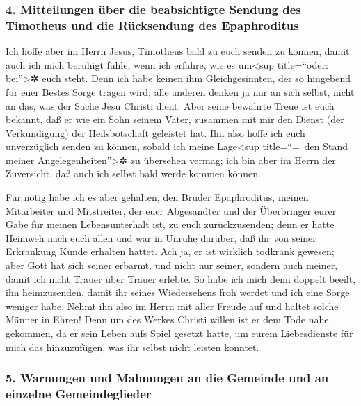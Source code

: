 \hypertarget{mitteilungen-uxfcber-die-beabsichtigte-sendung-des-timotheus-und-die-ruxfccksendung-des-epaphroditus}{%
\subsubsection{4. Mitteilungen über die beabsichtigte Sendung des
Timotheus und die Rücksendung des
Epaphroditus}\label{mitteilungen-uxfcber-die-beabsichtigte-sendung-des-timotheus-und-die-ruxfccksendung-des-epaphroditus}}

 Ich hoffe aber im Herrn Jesus, Timotheus bald zu euch
senden zu können, damit auch ich mich beruhigt fühle, wenn ich erfahre,
wie es um\textless sup title=``oder: bei''\textgreater✲ euch steht.
 Denn ich habe keinen ihm Gleichgesinnten, der so
hingebend für euer Bestes Sorge tragen wird;  alle
anderen denken ja nur an sich selbst, nicht an das, was der Sache Jesu
Christi dient.  Aber seine bewährte Treue ist euch
bekannt, daß er wie ein Sohn seinem Vater, zusammen mit mir den Dienst
(der Verkündigung) der Heilsbotschaft geleistet hat.  Ihn
also hoffe ich euch unverzüglich senden zu können, sobald ich meine
Lage\textless sup title=``=~den Stand meiner
Angelegenheiten''\textgreater✲ zu übersehen vermag;  ich
bin aber im Herrn der Zuversicht, daß auch ich selbst bald werde kommen
können.

 Für nötig habe ich es aber gehalten, den Bruder
Epaphroditus, meinen Mitarbeiter und Mitstreiter, der euer Abgesandter
und der Überbringer eurer Gabe für meinen Lebensunterhalt ist, zu euch
zurückzusenden;  denn er hatte Heimweh nach euch allen
und war in Unruhe darüber, daß ihr von seiner Erkrankung Kunde erhalten
hattet.  Ach ja, er ist wirklich todkrank gewesen; aber
Gott hat sich seiner erbarmt, und nicht nur seiner, sondern auch meiner,
damit ich nicht Trauer über Trauer erlebte.  So habe ich
mich denn doppelt beeilt, ihn heimzusenden, damit ihr seines
Wiedersehens froh werdet und ich eine Sorge weniger habe.
 Nehmt ihn also im Herrn mit aller Freude auf und haltet
solche Männer in Ehren!  Denn um des Werkes Christi
willen ist er dem Tode nahe gekommen, da er sein Leben aufs Spiel
gesetzt hatte, um eurem Liebesdienste für mich das hinzuzufügen, was ihr
selbst nicht leisten konntet.

\hypertarget{warnungen-und-mahnungen-an-die-gemeinde-und-an-einzelne-gemeindeglieder}{%
\subsubsection{5. Warnungen und Mahnungen an die Gemeinde und an
einzelne
Gemeindeglieder}\label{warnungen-und-mahnungen-an-die-gemeinde-und-an-einzelne-gemeindeglieder}}

